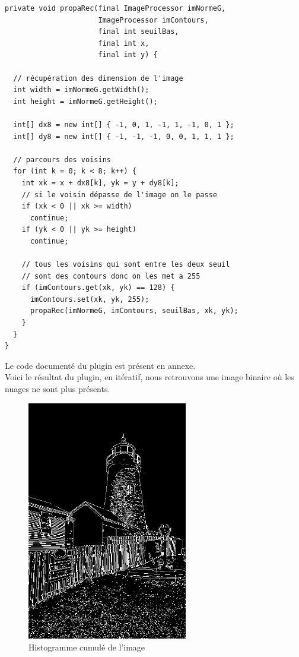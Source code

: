 \documentclass[a4paper,11pt]{article}
\begin{document}
  \begin{lstlisting}[caption=Fonction qui va déterminer si les contours entre les deux seuils sont corrects]
private void propaRec(final ImageProcessor imNormeG,
                      ImageProcessor imContours, 
                      final int seuilBas, 
                      final int x,
                      final int y) {

  // récupération des dimension de l'image
  int width = imNormeG.getWidth();
  int height = imNormeG.getHeight();

  int[] dx8 = new int[] { -1, 0, 1, -1, 1, -1, 0, 1 };
  int[] dy8 = new int[] { -1, -1, -1, 0, 0, 1, 1, 1 };

  // parcours des voisins
  for (int k = 0; k < 8; k++) {
    int xk = x + dx8[k], yk = y + dy8[k];
    // si le voisin dépasse de l'image on le passe
    if (xk < 0 || xk >= width)
      continue;
    if (yk < 0 || yk >= height)
      continue;

    // tous les voisins qui sont entre les deux seuil
    // sont des contours donc on les met a 255
    if (imContours.get(xk, yk) == 128) {
      imContours.set(xk, yk, 255);
      propaRec(imNormeG, imContours, seuilBas, xk, yk);
    }
  }
}
  \end{lstlisting}
  
  Le code documenté du plugin est présent en annexe.\\

  Voici le résultat du plugin, en itératif, nous retrouvons une image binaire où les nuages ne sont 
  plus présents.\\
  
  \begin{figure}[H]
  \center
   \includegraphics[width=7cm]{../canny_ite.png}
   \caption{Histogramme cumulé de l'image}
  \end{figure}
  
\end{document}
